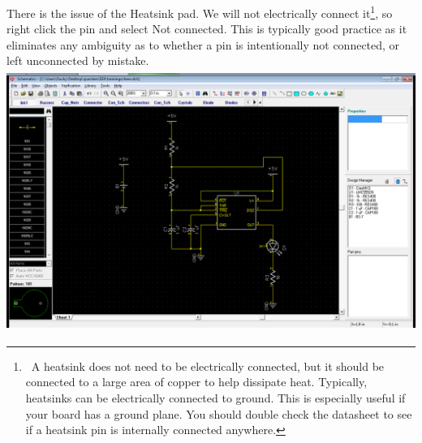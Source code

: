 \documentclass[letterpaper]{article}
\begin{document}
{\sffamily\color[rgb]{0.30980393,0.5058824,0.7411765}
There is the issue of the Heatsink pad. We will not electrically connect it\footnote{\ A heatsink does not need to be
electrically connected, but it should be connected to a large area of copper to help dissipate heat. Typically,
heatsinks can be electrically connected to ground. This is especially useful if your board has a ground plane. You
should double check the datasheet to see if a heatsink pin is internally connected anywhere.}, so right click the pin
and select {\textquotedbl}Not connected.{\textquotedbl} This is typically good practice as it eliminates any ambiguity
as to whether a pin is intentionally not connected, or left unconnected by mistake.\newline
\newline
 \includegraphics[width=5.4in,height=3.3665in]{figures/ee4document-img049.png} }
\end{document}
